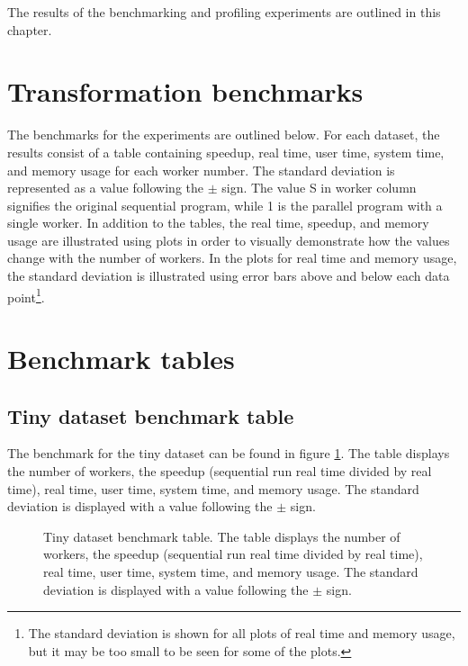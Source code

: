

The results of the benchmarking and profiling experiments are outlined in this chapter.
\section{Transformation benchmarks}
The benchmarks for the experiments are outlined below. For each dataset, the results consist of a table containing
speedup, real time, user time, system time, and memory usage for each worker number. The standard deviation is represented
as a value following the $\pm$ sign. The value S in worker column signifies the original sequential program, while 1 is the
parallel program with a single worker. In addition to the tables, the real time, speedup, and memory usage are illustrated
using plots in order to visually demonstrate how the values change with the number of workers. In the plots for real time
and memory usage, the standard deviation is illustrated using error bars above and below each data point\footnote{
The standard deviation is shown for all plots of real time and memory usage, but it may be too small to be seen for some of the plots.}.

\section{Benchmark tables}
\subsection{Tiny dataset benchmark table}
The benchmark for the tiny dataset can be found in figure \ref{fig:dataset_1_table}.
The table displays the number of workers, the speedup (sequential run real time divided by real time), real time,
user time, system time, and memory usage. The standard deviation is displayed with a value following the $\pm$ sign.

\begin{figure}[ht]
\centering
{}
\caption[Tiny dataset benchmark table.]{Tiny dataset benchmark table. The table displays the number of workers, the speedup (sequential run real time divided by real time), real time,
user time, system time, and memory usage. The standard deviation is displayed with a value following the $\pm$ sign.}
\label{fig:dataset_1_table}
\end{figure}

